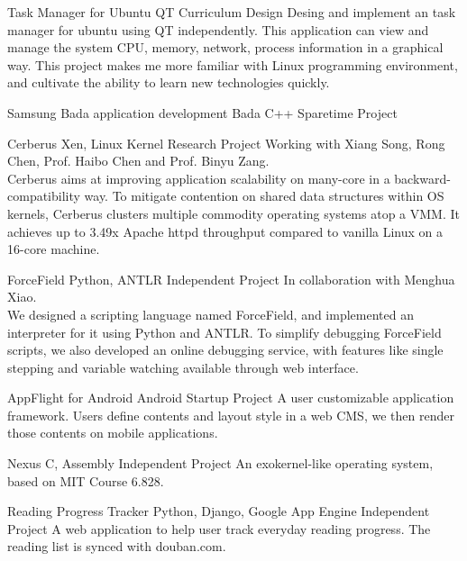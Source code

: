 \documentclass[11pt,a4paper]{moderncv}
\begin{document}
{Task Manager for Ubuntu}
{QT}
{Curriculum Design}{}
{
Desing and implement an task manager for ubuntu using QT independently. This application can view and manage
the system CPU, memory, network, process information  in a graphical way. This project makes me more familiar
with Linux programming environment, and cultivate the ability to learn new technologies quickly.
}

\vspace*{0.2\baselineskip}
{Samsung Bada application development}
{Bada C++}
{Sparetime Project}{}
{
}

\vspace*{0.2\baselineskip}
{Cerberus}
{Xen, Linux Kernel}
{Research Project}{}
{Working with Xiang Song, Rong Chen, Prof. Haibo Chen and Prof. Binyu Zang. \\
Cerberus aims at improving application scalability on many-core in a
backward-compatibility way. To mitigate contention on shared data
structures within OS kernels, Cerberus clusters multiple commodity
operating systems atop a VMM. It achieves up to 3.49x Apache httpd
throughput compared to vanilla Linux on a 16-core machine.
}

\vspace*{0.2\baselineskip}
{ForceField}
{Python, ANTLR}
{Independent Project}{}
{In collaboration with Menghua Xiao. \\
We designed a scripting language named ForceField, and implemented an
interpreter for it using Python and ANTLR. To simplify debugging
ForceField scripts, we also developed an online debugging service,
with features like single stepping and variable watching available
through web interface.
}

\vspace*{0.2\baselineskip}
{AppFlight for Android}
{Android}
{Startup Project}{}
{
A user customizable application framework. Users define contents and
layout style in a web CMS, we then render those contents on mobile
applications.
}

\vspace*{0.2\baselineskip}
{Nexus}
{C, Assembly}
{Independent Project}{}
{
An exokernel-like operating system, based on MIT Course 6.828.
}

\vspace*{0.2\baselineskip}
{Reading Progress Tracker}
{Python, Django, Google App Engine}
{Independent Project}{}
{
A web application to help user track everyday reading progress. The reading list is synced with douban.com.
}
\end{document}
